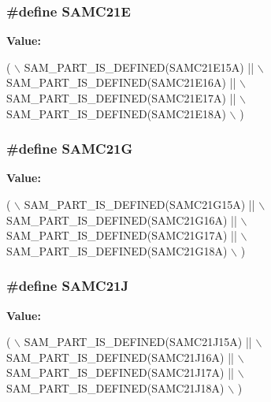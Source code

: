 \subsubsection[{S\+A\+M\+C21\+E}]{\setlength{\rightskip}{0pt plus 5cm}\#define S\+A\+M\+C21\+E}\label{group__sam__part__macros__group_ga3f154a978288c66ee8c267dcc90d34bd}
{\bfseries Value\+:}
\begin{DoxyCode}
( \(\backslash\)
        SAM\_PART\_IS\_DEFINED(SAMC21E15A) || \(\backslash\)
        SAM\_PART\_IS\_DEFINED(SAMC21E16A) || \(\backslash\)
        SAM\_PART\_IS\_DEFINED(SAMC21E17A) || \(\backslash\)
        SAM\_PART\_IS\_DEFINED(SAMC21E18A) \(\backslash\)
    )
\end{DoxyCode}
\hypertarget{group__sam__part__macros__group_ga11adf939524e0b28311c847bc8933d4b}{}
\subsubsection[{S\+A\+M\+C21\+G}]{\setlength{\rightskip}{0pt plus 5cm}\#define S\+A\+M\+C21\+G}\label{group__sam__part__macros__group_ga11adf939524e0b28311c847bc8933d4b}
{\bfseries Value\+:}
\begin{DoxyCode}
( \(\backslash\)
        SAM\_PART\_IS\_DEFINED(SAMC21G15A) || \(\backslash\)
        SAM\_PART\_IS\_DEFINED(SAMC21G16A) || \(\backslash\)
        SAM\_PART\_IS\_DEFINED(SAMC21G17A) || \(\backslash\)
        SAM\_PART\_IS\_DEFINED(SAMC21G18A) \(\backslash\)
    )
\end{DoxyCode}
\hypertarget{group__sam__part__macros__group_gaaecc832b9662714c608e2a02449651d7}{}
\subsubsection[{S\+A\+M\+C21\+J}]{\setlength{\rightskip}{0pt plus 5cm}\#define S\+A\+M\+C21\+J}\label{group__sam__part__macros__group_gaaecc832b9662714c608e2a02449651d7}
{\bfseries Value\+:}
\begin{DoxyCode}
( \(\backslash\)
        SAM\_PART\_IS\_DEFINED(SAMC21J15A) || \(\backslash\)
        SAM\_PART\_IS\_DEFINED(SAMC21J16A) || \(\backslash\)
        SAM\_PART\_IS\_DEFINED(SAMC21J17A) || \(\backslash\)
        SAM\_PART\_IS\_DEFINED(SAMC21J18A) \(\backslash\)
    )
\end{DoxyCode}
\hypertarget{group__sam__part__macros__group_ga5eed5c828e076621e5274450cdc6c32b}{}
